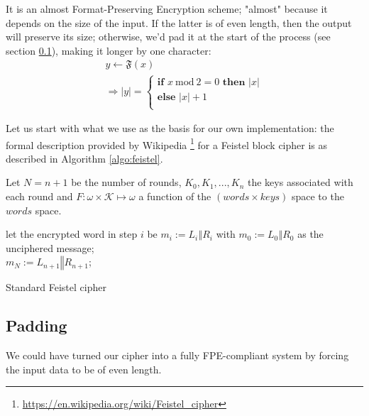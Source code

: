 \documentclass[twoside,twocolumn]{article}
\newcommand{\mod}[1]{\ \mathrm{mod}\ #1}
\theoremstyle{definition}
\theoremstyle{remark}
\begin{document}
It is an almost Format-Preserving Encryption scheme; "almost" because it depends on the size of the input. If the latter is of even length, then the 
output will preserve its size; otherwise, we'd pad it at the start of the process (see section \ref{padding}), making it longer by one character:
\begin{equation}
    \label{fpe}
    \begin{array}{l}
        y \gets \mathfrak{F}(x) \\
        \Rightarrow |y| = \left\{
            \begin{array}{l}
                \textbf{if } x \mod 2 = 0 \textbf{ then } |x| \\
                \textbf{else } |x| + 1 \\
            \end{array}
            \right.
    \end{array}
\end{equation}

Let us start with what we use as the basis for our own implementation: the formal description provided by Wikipedia
\footnote{\url{https://en.wikipedia.org/wiki/Feistel_cipher}} for a Feistel block cipher is as described in Algorithm \ref{algo:feistel}.

Let $N = n+1$ be the number of rounds, $K_{0},K_{1},...,K_{n}$ the keys associated with each round and $F: \omega \times \mathcal{K} \mapsto \omega$ a 
function of the $(words \times keys)$ space to the $words$ space.
\begin{algorithm}
    let the encrypted word in step $i$ be $m_i := L_i \mathbin\Vert R_i$ with $m_0 := L_0 \mathbin\Vert R_0$ as the unciphered message; \\
    $m_N := L_{n+1} \mathbin\Vert R_{n+1}$; \\
    \caption{Standard Feistel cipher}
    \label{algo:feistel}
\end{algorithm}

\subsection{Padding}
\label{padding}

We could have turned our cipher into a fully FPE-compliant system by forcing the input data to be of even length.
\end{document}
